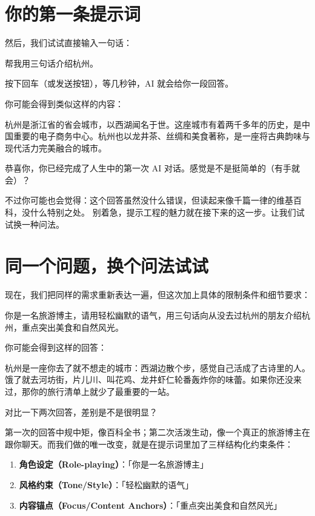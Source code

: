 \section{你的第一条提示词}

然后，我们试试直接输入一句话：

\begin{promptbox}
帮我用三句话介绍杭州。
\end{promptbox}

按下回车（或发送按钮），等几秒钟，AI 就会给你一段回答。

你可能会得到类似这样的内容：

\begin{aibox}
杭州是浙江省的省会城市，以西湖闻名于世。这座城市有着两千多年的历史，是中国重要的电子商务中心。杭州也以龙井茶、丝绸和美食著称，是一座将古典韵味与现代活力完美融合的城市。
\end{aibox}

恭喜你，你已经完成了人生中的第一次 AI 对话。感觉是不是挺简单的（有手就会）？

不过你可能也会觉得：这个回答虽然没什么错误，但读起来像千篇一律的维基百科，没什么特别之处。
别着急，提示工程的魅力就在接下来的这一步。让我们试试换一种问法。

\section{同一个问题，换个问法试试}

现在，我们把同样的需求重新表达一遍，但这次加上具体的限制条件和细节要求：

\begin{promptbox}
你是一名旅游博主，请用轻松幽默的语气，用三句话向从没去过杭州的朋友介绍杭州，重点突出美食和自然风光。
\end{promptbox}

你可能会得到这样的回答：

\begin{aibox}
杭州是一座你去了就不想走的城市：西湖边散个步，感觉自己活成了古诗里的人。饿了就去河坊街，片儿川、叫花鸡、龙井虾仁轮番轰炸你的味蕾。如果你还没来过，那你的旅行清单上就少了最重要的一站。
\end{aibox}

对比一下两次回答，差别是不是很明显？

第一次的回答中规中矩，像百科全书；第二次活泼生动，像一个真正的旅游博主在跟你聊天。而我们做的唯一改变，就是在提示词里加了三样结构化约束条件：

\begin{enumerate}
  \item \textbf{角色设定（Role-playing）}：「你是一名旅游博主」
  \item \textbf{风格约束（Tone/Style）}：「轻松幽默的语气」
  \item \textbf{内容锚点（Focus/Content Anchors）}：「重点突出美食和自然风光」
\end{enumerate}

